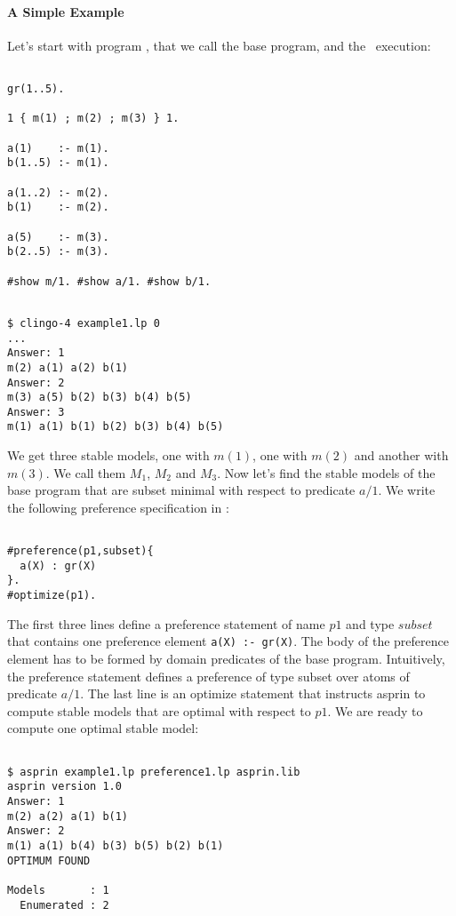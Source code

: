 

\paragraph{A Simple Example}

Let's start with program  , that we call the base program,  and the  \clingo\  execution: 
\begin{verbatim}

gr(1..5).

1 { m(1) ; m(2) ; m(3) } 1.   

a(1)    :- m(1).
b(1..5) :- m(1).

a(1..2) :- m(2).
b(1)    :- m(2).

a(5)    :- m(3).
b(2..5) :- m(3). 

#show m/1. #show a/1. #show b/1.
\end{verbatim}
\begin{verbatim}

$ clingo-4 example1.lp 0
...
Answer: 1
m(2) a(1) a(2) b(1) 
Answer: 2
m(3) a(5) b(2) b(3) b(4) b(5) 
Answer: 3
m(1) a(1) b(1) b(2) b(3) b(4) b(5)

\end{verbatim}
We get three stable models, one with $m(1)$, one with $m(2)$ and another with $m(3)$. We call them $M_1$, $M_2$ and $M_3$. 
Now let's find the stable models of the base program that are subset minimal with respect to predicate $a/1$. 
We write the following preference specification in : 
\begin{verbatim}

#preference(p1,subset){                                                                                             
  a(X) : gr(X)                                                                                                    
}.
#optimize(p1).
\end{verbatim}
The first three lines define a preference statement of name $p1$ and type $subset$ that contains one preference element 
\lstinline{a(X) :- gr(X)}. The body of the preference element has to be formed by domain predicates of the base program.
Intuitively, the preference statement defines a preference of type subset over atoms of predicate $a/1$. 
The last line is an optimize statement that instructs asprin to compute stable models that are optimal with respect to $p1$. 
We are ready to compute one optimal stable model: 
\begin{verbatim}

$ asprin example1.lp preference1.lp asprin.lib
asprin version 1.0
Answer: 1
m(2) a(2) a(1) b(1)
Answer: 2
m(1) a(1) b(4) b(3) b(5) b(2) b(1)
OPTIMUM FOUND

Models       : 1
  Enumerated : 2

\end{verbatim}
